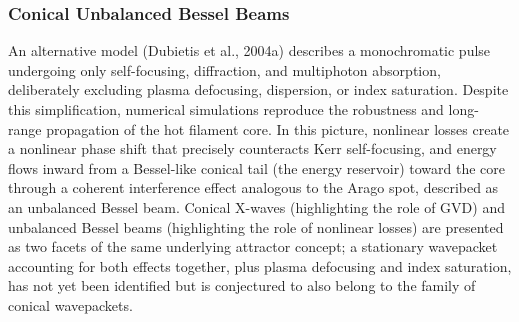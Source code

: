 \documentclass[11pt,a4paper]{article}
\begin{document}
\subsubsection{Conical Unbalanced Bessel Beams}
An alternative model (Dubietis et al., 2004a) describes a monochromatic pulse undergoing only self-focusing, diffraction, and multiphoton absorption, deliberately excluding plasma defocusing, dispersion, or index saturation. Despite this simplification, numerical simulations reproduce the robustness and long-range propagation of the hot filament core. In this picture, nonlinear losses create a nonlinear phase shift that precisely counteracts Kerr self-focusing, and energy flows inward from a Bessel-like conical tail (the energy reservoir) toward the core through a coherent interference effect analogous to the Arago spot, described as an unbalanced Bessel beam. Conical X-waves (highlighting the role of GVD) and unbalanced Bessel beams (highlighting the role of nonlinear losses) are presented as two facets of the same underlying attractor concept; a stationary wavepacket accounting for both effects together, plus plasma defocusing and index saturation, has not yet been identified but is conjectured to also belong to the family of conical wavepackets.
\end{document}
